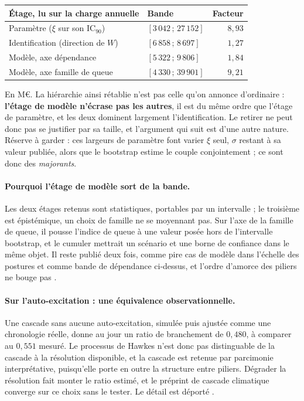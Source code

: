 \begin{center}\footnotesize
\renewcommand{\arraystretch}{1.25}
\begin{tabular}{@{}l l r@{}}
\toprule
\textbf{Étage, lu sur la charge annuelle} & \textbf{Bande} & \textbf{Facteur} \\
\midrule
Paramètre ($\xi$ sur son IC$_{90}$) & $[3\,042\,;\,27\,152]$ & $8{,}93$ \\
Identification (direction de $W$) & $[6\,858\,;\,8\,697]$ & $1{,}27$ \\
Modèle, axe dépendance & $[5\,322\,;\,9\,806]$ & $1{,}84$ \\
Modèle, axe famille de queue & $[4\,330\,;\,39\,901]$ & $9{,}21$ \\
\bottomrule
\end{tabular}
\end{center}

\vspace{4pt}
\noindent En M\euro. La hiérarchie ainsi rétablie n'est pas celle qu'on annonce d'ordinaire :
\textbf{l'étage de modèle n'écrase pas les autres}, il est du même ordre que l'étage de paramètre,
et les deux dominent largement l'identification. Le retirer ne peut donc pas se justifier par sa
taille, et l'argument qui suit est d'une autre nature. Réserve à garder : ces largeurs de
paramètre font varier $\xi$ seul, $\sigma$ restant à sa valeur publiée, alors que le bootstrap
estime le couple conjointement ; ce sont donc des \emph{majorants}.

\paragraph{Pourquoi l'étage de modèle sort de la bande.} Les deux étages retenus sont
statistiques, portables par un intervalle ; le troisième est épistémique, un choix de famille ne
se moyennant pas. Sur l'axe de la famille de queue, il pousse l'indice de queue à une valeur
posée hors de l'intervalle bootstrap, et le cumuler mettrait un scénario et une borne de
confiance dans le même objet. Il reste publié deux fois, comme pire cas de modèle dans l'échelle
des postures et comme bande de dépendance ci-dessus, et l'ordre d'amorce des piliers ne bouge
pas \matcomp.

\paragraph{Sur l'auto-excitation : une équivalence observationnelle.} Une cascade sans aucune
auto-excitation, simulée puis ajustée comme une chronologie réelle, donne au jour un ratio de
branchement de $0{,}480$, à comparer au $0{,}551$ mesuré. Le processus de Hawkes n'est donc pas
distinguable de la cascade à la résolution disponible, et la cascade est retenue par parcimonie
interprétative, puisqu'elle porte en outre la structure entre piliers. Dégrader la résolution
fait monter le ratio estimé, et le préprint de cascade climatique converge sur ce choix sans le
tester. Le détail est déporté \matcomp.


